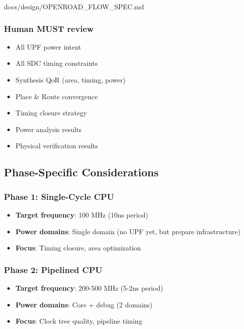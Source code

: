 \begin{relocated}{docs/design/OPENROAD_FLOW_SPEC.md}
\subsubsection{Human MUST review}\label{tm:pd:openroad-flow:human-must-review}

\begin{itemize}
\tightlist
\item
  All UPF power intent
\item
  All SDC timing constraints
\item
  Synthesis QoR (area, timing, power)
\item
  Place \& Route convergence
\item
  Timing closure strategy
\item
  Power analysis results
\item
  Physical verification results
\end{itemize}

\subsection{Phase-Specific Considerations}\label{tm:pd:openroad-flow:phase-specific-considerations}

\subsubsection{Phase 1: Single-Cycle CPU}\label{tm:pd:openroad-flow:phase-1-single-cycle-cpu}

\begin{itemize}
\tightlist
\item
  \textbf{Target frequency}: 100 MHz (10ns period)
\item
  \textbf{Power domains}: Single domain (no UPF yet, but prepare
  infrastructure)
\item
  \textbf{Focus}: Timing closure, area optimization
\end{itemize}

\subsubsection{Phase 2: Pipelined CPU}\label{tm:pd:openroad-flow:phase-2-pipelined-cpu}

\begin{itemize}
\tightlist
\item
  \textbf{Target frequency}: 200-500 MHz (5-2ns period)
\item
  \textbf{Power domains}: Core + debug (2 domains)
\item
  \textbf{Focus}: Clock tree quality, pipeline timing
\end{itemize}


\end{relocated}
